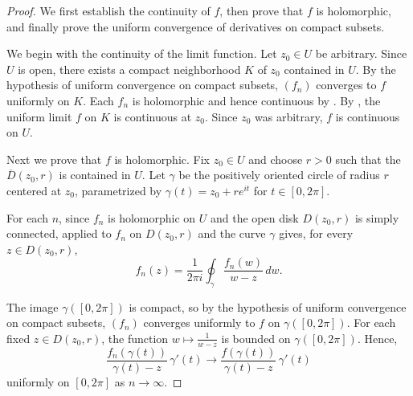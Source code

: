 \begin{proof}
    We first establish the continuity of $f$, then prove that $f$ is holomorphic, and finally prove the uniform convergence of derivatives on compact subsets.

    We begin with the continuity of the limit function. Let $z_0 \in U$ be arbitrary. Since $U$ is open, there exists a compact neighborhood $K$ of $z_0$ contained in $U$. By the hypothesis of uniform convergence on compact subsets, $(f_n)$ converges to $f$ uniformly on $K$. Each $f_n$ is holomorphic and hence continuous by . By , the uniform limit $f$ on $K$ is continuous at $z_0$. Since $z_0$ was arbitrary, $f$ is continuous on $U$.

    Next we prove that $f$ is holomorphic. Fix $z_0 \in U$ and choose $r > 0$ such that the  $\overline{D}(z_0, r)$ is contained in $U$. Let $\gamma$ be the positively oriented circle of radius $r$ centered at $z_0$, parametrized by $\gamma(t) = z_0 + r e^{it}$ for $t \in [0, 2\pi]$.

    For each $n$, since $f_n$ is holomorphic on $U$ and the open disk $D(z_0, r)$ is simply connected,  applied to $f_n$ on $D(z_0, r)$ and the curve $\gamma$ gives, for every $z \in D(z_0, r)$,
    $$f_n(z) = \frac{1}{2\pi i} \oint_{\gamma} \frac{f_n(w)}{w - z}\,dw.$$

    The image $\gamma([0,2\pi])$ is compact, so by the hypothesis of uniform convergence on compact subsets, $(f_n)$ converges uniformly to $f$ on $\gamma([0,2\pi])$. For each fixed $z \in D(z_0, r)$, the function $w \mapsto \frac{1}{w - z}$ is bounded on $\gamma([0,2\pi])$. Hence,
    $$\frac{f_n(\gamma(t))}{\gamma(t) - z}\,\gamma'(t) \longrightarrow \frac{f(\gamma(t))}{\gamma(t) - z}\,\gamma'(t)$$
    uniformly on $[0,2\pi]$ as $n \to \infty$.


\end{proof}
